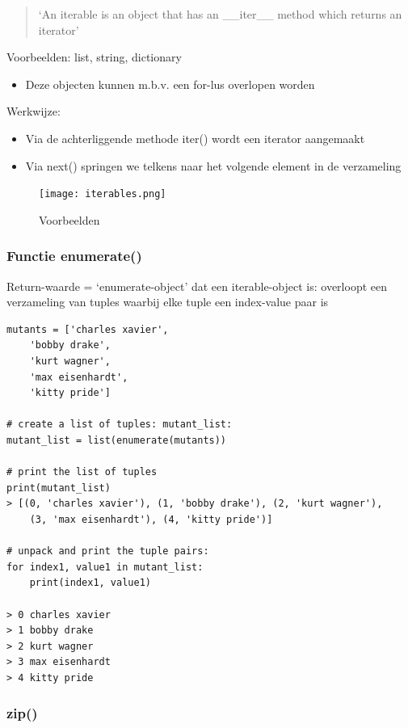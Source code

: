 \documentclass{article}
\begin{document}
\begin{quote}
    `An iterable is an object that has an \_\_iter\_\_ method which returns an iterator'
\end{quote}

Voorbeelden: list, string, dictionary

\begin{itemize}
    \item Deze objecten kunnen m.b.v. een for-lus overlopen worden
\end{itemize}

Werkwijze: 

\begin{itemize}
    \item Via de achterliggende methode iter() wordt een iterator aangemaakt
    \item Via next() springen we telkens naar het volgende element in de verzameling
\end{itemize}

\begin{figure}[H]
    \centering
    \texttt{[image: iterables.png]}
    \caption{Voorbeelden}
\end{figure}

\subsubsection{Functie enumerate()}

Return-waarde = `enumerate-object' dat een iterable-object is:
overloopt een verzameling van tuples waarbij elke tuple een index-value paar is

\begin{verbatim}
mutants = ['charles xavier', 
    'bobby drake', 
    'kurt wagner', 
    'max eisenhardt', 
    'kitty pride']

# create a list of tuples: mutant_list:
mutant_list = list(enumerate(mutants))

# print the list of tuples
print(mutant_list)
> [(0, 'charles xavier'), (1, 'bobby drake'), (2, 'kurt wagner'), 
    (3, 'max eisenhardt'), (4, 'kitty pride')]

# unpack and print the tuple pairs:
for index1, value1 in mutant_list:
    print(index1, value1)

> 0 charles xavier
> 1 bobby drake
> 2 kurt wagner
> 3 max eisenhardt
> 4 kitty pride
\end{verbatim}

\subsubsection{zip()}
\end{document}
